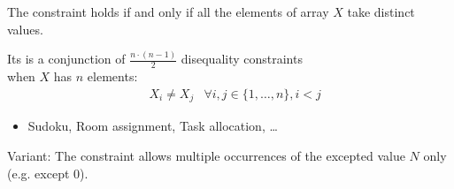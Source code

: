 \documentclass{cons-beamer}
\begin{document}
\begin{frame}{}
  \begin{definition}
    The  constraint holds if and only if all the elements of array $X$ take distinct values.
  \end{definition}
  
  Its  is a conjunction of $\frac{n \cdot (n-1)}{2}$ disequality constraints \\
  when \( X \) has \( n \) elements:
  \begin{align*}
  	&X_i \neq X_j  &\forall i, j \in \{1, \ldots, n\}, i < j
  \end{align*}
  \vfill

  \begin{examples}
    \begin{itemize}
      \item Sudoku, Room assignment, Task allocation, \dots
    \end{itemize}
  \end{examples}
  \vfill
  \pause

  Variant: The  constraint allows multiple occurrences of the excepted value $N$ only (e.g. except $0$).
\end{frame}
\end{document}
